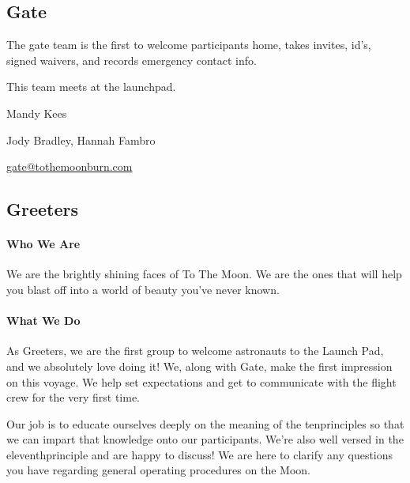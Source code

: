 \subsection*{Gate}
The \gls{gate} team is the first to welcome participants home, takes invites, id's, signed waivers, and records emergency contact info.

This team meets at the \gls{launchpad}.

\begin{description}[leftmargin=6em,noitemsep,style=nextline]
   \item[Lead:] Mandy Kees
   \item[Co-leads:] Jody Bradley, Hannah Fambro
   \item[Contact:] \url{gate@tothemoonburn.com}
\end{description}


\subsection*{Greeters}

\paragraph{Who We Are}
We are the brightly shining faces of To The Moon.  We are the ones that will help you blast off into a world of beauty you've never known.

\paragraph{What We Do}

As Greeters, we are the first group to welcome astronauts to the Launch Pad, and we absolutely love doing it!  We, along with Gate, make the first impression on this voyage.  We help set expectations and get to communicate with the flight crew for the very first time. 

Our job is to educate ourselves deeply on the meaning of the \gls{tenprinciples} so that we can impart that knowledge onto our participants.  We're also well versed in the \gls{eleventhprinciple} and are happy to discuss!  We are here to clarify any questions you have regarding general operating procedures on the Moon. 

